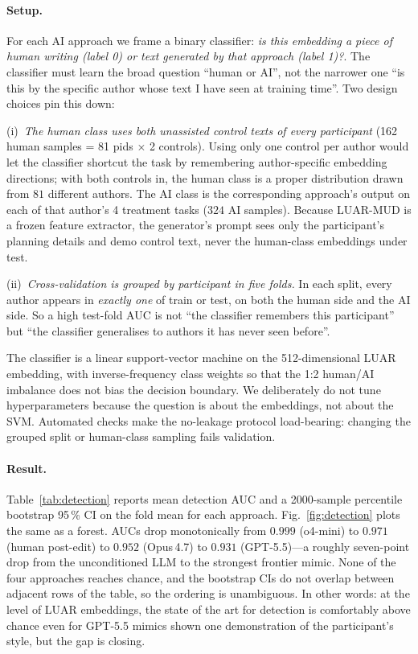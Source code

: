 \documentclass[runningheads]{llncs}
\begin{document}
\paragraph{Setup.}
For each AI approach we frame a binary classifier: \emph{is this
embedding a piece of human writing (label 0) or text generated by
that approach (label 1)?}. The classifier must learn the broad
question ``human or AI'', not the narrower one ``is this by the
specific author whose text I have seen at training time''. Two
design choices pin this down:

(i)~\emph{The human class uses both unassisted control texts of every
participant} (162 human samples = 81 pids $\times$ 2 controls). Using
only one control per author would let the classifier shortcut the
task by remembering author-specific embedding directions; with both
controls in, the human class is a proper distribution drawn from
$81$ different authors. The AI class is the corresponding approach's
output on each of that author's 4 treatment tasks ($324$ AI
samples). Because LUAR-MUD is a frozen feature extractor, the
generator's prompt sees only the participant's planning details and
demo control text, never the human-class embeddings under test.

(ii)~\emph{Cross-validation is grouped by participant in five folds.}
In each split, every author appears in \emph{exactly one} of train
or test, on both the human side and the AI side. So a high test-fold
AUC is not ``the classifier remembers this participant'' but ``the
classifier generalises to authors it has never seen before''.

The classifier is a linear support-vector machine
on the 512-dimensional LUAR embedding, with inverse-frequency class
weights so that the 1:2 human/AI imbalance does not bias the
decision boundary. We deliberately do not tune hyperparameters
because the question is about the embeddings, not about the SVM.
Automated checks make the no-leakage protocol load-bearing:
changing the grouped split or human-class sampling fails validation.

\paragraph{Result.}
Table~\ref{tab:detection} reports mean detection AUC and a 2000-sample
percentile bootstrap 95\,\% CI on the fold mean for each approach.
Fig.~\ref{fig:detection} plots the same as a forest. AUCs drop
monotonically from $0.999$ (o4-mini) to $0.971$ (human post-edit) to
$0.952$ (Opus\,4.7) to $0.931$ (GPT-5.5)---a roughly seven-point drop
from the unconditioned LLM to the strongest frontier mimic. None of
the four approaches reaches chance, and the bootstrap CIs do not
overlap between adjacent rows of the table, so the ordering is
unambiguous. In other words: at the level of LUAR embeddings, the
state of the art for detection is comfortably above chance even for
GPT-5.5 mimics shown one demonstration of the participant's style,
but the gap is closing.
\end{document}
